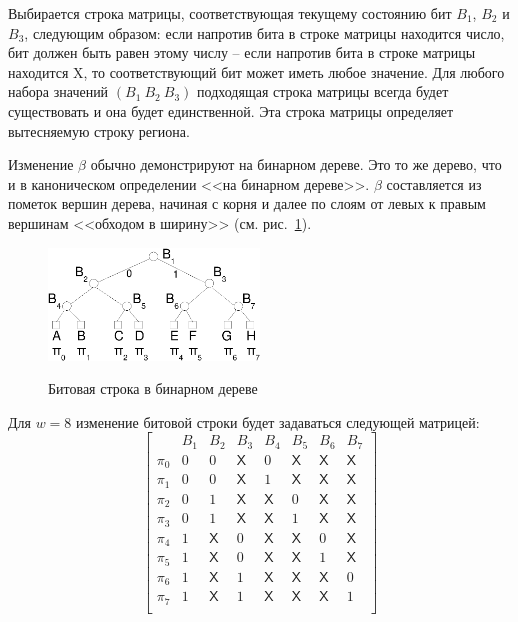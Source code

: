 Выбирается строка матрицы, соответствующая текущему состоянию бит $B_1$,
$B_2$ и $B_3$, следующим образом: если напротив бита в строке матрицы находится число, бит
должен быть равен этому числу -- если напротив бита в строке матрицы
находится \textsf{X}, то соответствующий бит может иметь любое значение. Для любого набора значений $(B_1~B_2~B_3)$ подходящая строка матрицы всегда будет существовать и она будет единственной. Эта строка матрицы определяет вытесняемую строку региона.

Изменение $\beta$ обычно демонстрируют на бинарном дереве. Это то же дерево, что и в каноническом определении \PseudoLRU <<на бинарном дереве>>. $\beta$ составляется из пометок вершин дерева, начиная с корня и далее по слоям от левых к правым вершинам <<обходом в ширину>> (см. рис.~\ref{plru_bittree}).

\begin{figure}[h] \center
  \includegraphics[width=0.5\textwidth]{2.theor/plru}\\
  \caption{Битовая строка в бинарном дереве}\label{plru_bittree}
\end{figure}

Для $w=8$ изменение битовой строки будет задаваться следующей матрицей:
$$
\left[
  \begin{array}{c|ccccccc}
          & B_1 & B_2 & B_3 & B_4 & B_5 & B_6 & B_7 \\ \hline
    \pi_0 & 0 & 0 & \textsf{X} & 0 & \textsf{X} & \textsf{X} & \textsf{X} \\
    \pi_1 & 0 & 0 & \textsf{X} & 1 & \textsf{X} & \textsf{X} & \textsf{X} \\
    \pi_2 & 0 & 1 & \textsf{X} & \textsf{X} & 0 & \textsf{X} & \textsf{X} \\
    \pi_3 & 0 & 1 & \textsf{X} & \textsf{X} & 1 & \textsf{X} & \textsf{X} \\
    \pi_4 & 1 & \textsf{X} & 0 & \textsf{X} & \textsf{X} & 0 & \textsf{X} \\
    \pi_5 & 1 & \textsf{X} & 0 & \textsf{X} & \textsf{X} & 1 & \textsf{X} \\
    \pi_6 & 1 & \textsf{X} & 1 & \textsf{X} & \textsf{X} & \textsf{X} & 0 \\
    \pi_7 & 1 & \textsf{X} & 1 & \textsf{X} & \textsf{X} & \textsf{X} & 1 \\
  \end{array}
\right]
$$

